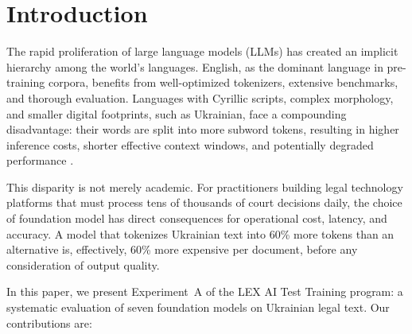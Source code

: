 \documentclass[11pt,a4paper]{article}
\begin{document}
\section{Introduction}

The rapid proliferation of large language models (LLMs) has created an implicit hierarchy among the world's languages. English, as the dominant language in pre-training corpora, benefits from well-optimized tokenizers, extensive benchmarks, and thorough evaluation. Languages with Cyrillic scripts, complex morphology, and smaller digital footprints, such as Ukrainian, face a compounding disadvantage: their words are split into more subword tokens, resulting in higher inference costs, shorter effective context windows, and potentially degraded performance \citep{petrov2024language, ahia2023all}.

This disparity is not merely academic. For practitioners building legal technology platforms that must process tens of thousands of court decisions daily, the choice of foundation model has direct consequences for operational cost, latency, and accuracy. A model that tokenizes Ukrainian text into 60\% more tokens than an alternative is, effectively, 60\% more expensive per document, before any consideration of output quality.

In this paper, we present Experiment~A of the LEX AI Test Training program: a systematic evaluation of seven foundation models on Ukrainian legal text. Our contributions are:
\end{document}
